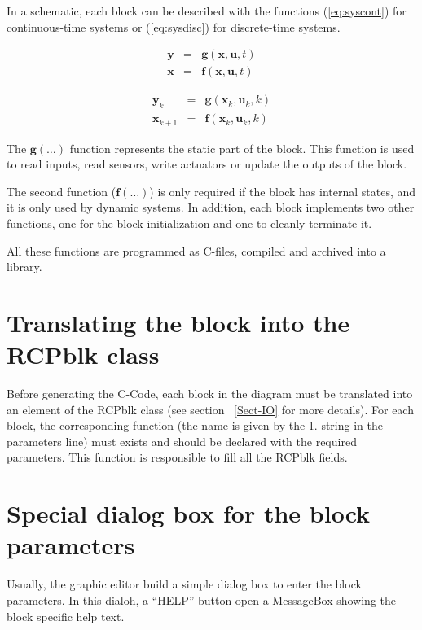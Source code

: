In a schematic, each block can be described with the functions 
(\ref{eq:syscont}) for continuous-time systems or (\ref{eq:sysdisc}) for 
discrete-time systems.

\begin{equation}
\label{eq:syscont}
\begin{array}{lll}
\mathbf{y} & = & \mathbf{g}(\mathbf{x},\mathbf{u},t) \\
\dot{\mathbf{x}} & = & \mathbf{f}(\mathbf{x},\mathbf{u},t) 
\end{array}
\end{equation}

\begin{equation}
\label{eq:sysdisc}
\begin{array}{lll}
\mathbf{y}_k & = & \mathbf{g}(\mathbf{x}_k,\mathbf{u}_k,k) \\
\mathbf{x}_{k+1} & = & \mathbf{f}(\mathbf{x}_k,\mathbf{u}_k,k) 
\end{array}
\end{equation}

The $\mathbf{g}(\ldots)$ function represents the static part of the block. 
This function is used to read inputs, read sensors, write actuators or 
update the outputs of the block.

The second function ($\mathbf{f}(\ldots)$) is only required if the block has 
internal states, and it is only used by dynamic systems. In 
addition, each block implements two other functions, one for the block 
initialization and one to cleanly terminate it.

All these functions are programmed as C-files, compiled and archived into a 
library.

\section{Translating the block into the RCPblk class}
Before generating the C-Code, each block in the diagram must be translated into 
an element of the RCPblk class (see section ~\ref{Sect-IO} for more details).
For each block, the corresponding function (the name is given by the 1. string 
in the parameters line) 
must exists and should be declared with the required parameters. This function 
is responsible to fill all the RCPblk fields.

\section{Special dialog box for the block parameters}
Usually, the graphic editor build a simple dialog box to enter the block 
parameters. In this dialoh, a ``HELP'' button open a MessageBox showing the block specific help text.

